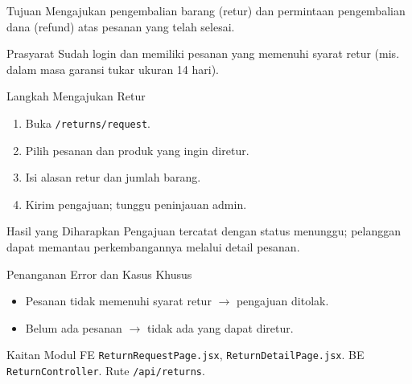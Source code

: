 
\begin{flowsection}{Tujuan}
Mengajukan pengembalian barang (retur) dan permintaan pengembalian dana (refund)
atas pesanan yang telah selesai.
\end{flowsection}

\begin{flowsection}{Prasyarat}
Sudah login dan memiliki pesanan yang memenuhi syarat retur (mis. dalam masa
garansi tukar ukuran 14 hari).
\end{flowsection}

\begin{flowsection}{Langkah Mengajukan Retur}
\begin{enumerate}
  \item Buka \texttt{/returns/request}.
  \item Pilih pesanan dan produk yang ingin diretur.
  \item Isi alasan retur dan jumlah barang.
  \item Kirim pengajuan; tunggu peninjauan admin.
\end{enumerate}
\end{flowsection}


\begin{flowsection}{Hasil yang Diharapkan}
Pengajuan tercatat dengan status menunggu; pelanggan dapat memantau perkembangannya
melalui detail pesanan.
\end{flowsection}

\begin{flowsection}{Penanganan Error dan Kasus Khusus}
\begin{itemize}
  \item Pesanan tidak memenuhi syarat retur $\rightarrow$ pengajuan ditolak.
  \item Belum ada pesanan $\rightarrow$ tidak ada yang dapat diretur.
\end{itemize}
\end{flowsection}

\begin{flowsection}{Kaitan Modul}
FE \texttt{ReturnRequestPage.jsx}, \texttt{ReturnDetailPage.jsx}. BE
\texttt{ReturnController}. Rute \texttt{/api/returns}.
\end{flowsection}

